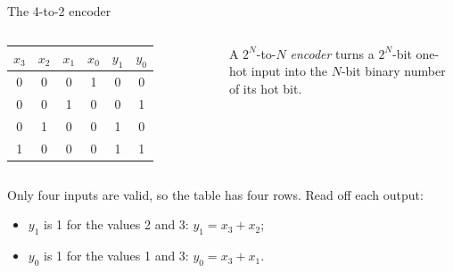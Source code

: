 \documentclass[10pt]{wosm-slides}
\begin{document}
\begin{frame}{The 4-to-2 encoder}
  \begin{columns}[c, totalwidth=\textwidth]
      \centering
      \begin{tabular}{@{}cccc|cc@{}}
        $x_3$ & $x_2$ & $x_1$ & $x_0$ & $y_1$ & $y_0$ \\
        \midrule
        0 & 0 & 0 & 1 & 0 & 0 \\
        0 & 0 & 1 & 0 & 0 & 1 \\
        0 & 1 & 0 & 0 & 1 & 0 \\
        1 & 0 & 0 & 0 & 1 & 1 \\
      \end{tabular}
      \begin{definition}[Encoder]
        A $2^N$-to-$N$ \emph{encoder} turns a $2^N$-bit one-hot input into the
        $N$-bit binary number of its hot bit.
      \end{definition}
  \end{columns}

  \bigskip
  Only four inputs are valid, so the table has four rows. Read off each output:
  \begin{itemize}
    \item $y_1$ is 1 for the values 2 and 3: \quad $y_1 = x_3 + x_2$;
    \item $y_0$ is 1 for the values 1 and 3: \quad $y_0 = x_3 + x_1$.
  \end{itemize}
\end{frame}
\end{document}
